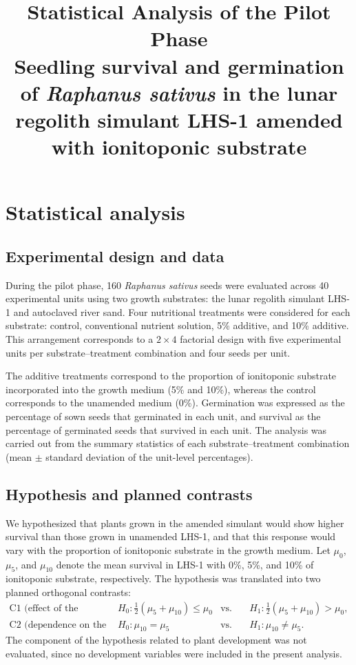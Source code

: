 \documentclass[11pt]{article}
\title{\textbf{Statistical Analysis of the Pilot Phase}\\[4pt]
\large Seedling survival and germination of \textit{Raphanus sativus} in the lunar regolith simulant LHS-1 amended with ionitoponic substrate}
\author{}
\date{}
\begin{document}
\maketitle
\vspace{-3em}

\section{Statistical analysis}

\subsection{Experimental design and data}

During the pilot phase, 160 \textit{Raphanus sativus} seeds were evaluated across 40 experimental units using two growth substrates: the lunar regolith simulant LHS-1 and autoclaved river sand. Four nutritional treatments were considered for each substrate: control, conventional nutrient solution, 5\% additive, and 10\% additive. This arrangement corresponds to a $2 \times 4$ factorial design with five experimental units per substrate--treatment combination and four seeds per unit.

The additive treatments correspond to the proportion of ionitoponic substrate incorporated into the growth medium (5\% and 10\%), whereas the control corresponds to the unamended medium (0\%). Germination was expressed as the percentage of sown seeds that germinated in each unit, and survival as the percentage of germinated seeds that survived in each unit. The analysis was carried out from the summary statistics of each substrate--treatment combination (mean $\pm$ standard deviation of the unit-level percentages).

\subsection{Hypothesis and planned contrasts}

We hypothesized that plants grown in the amended simulant would show higher survival than those grown in unamended LHS-1, and that this response would vary with the proportion of ionitoponic substrate in the growth medium. Let $\mu_0$, $\mu_5$, and $\mu_{10}$ denote the mean survival in LHS-1 with 0\%, 5\%, and 10\% of ionitoponic substrate, respectively. The hypothesis was translated into two planned orthogonal contrasts:
\begin{align*}
\text{C1 (effect of the amendment):} \quad & H_0\colon \tfrac{1}{2}(\mu_5 + \mu_{10}) \le \mu_0 & \text{vs.} \quad & H_1\colon \tfrac{1}{2}(\mu_5 + \mu_{10}) > \mu_0,\\[2pt]
\text{C2 (dependence on the proportion):} \quad & H_0\colon \mu_{10} = \mu_5 & \text{vs.} \quad & H_1\colon \mu_{10} \ne \mu_5.
\end{align*}
The component of the hypothesis related to plant development was not evaluated, since no development variables were included in the present analysis.
\end{document}
